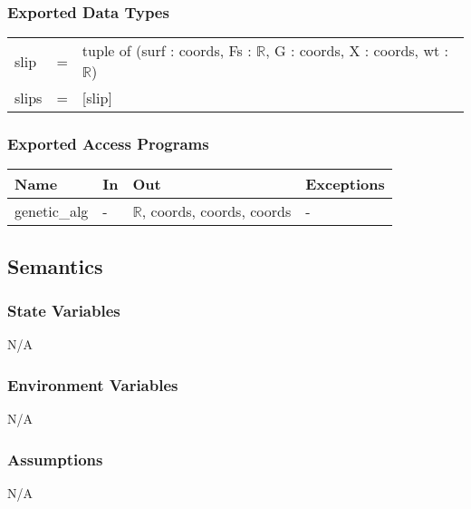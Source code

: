\documentclass[12pt, titlepage]{article}
\begin{document}
\subsubsection{Exported Data Types}
\renewcommand*{\arraystretch}{1.5}
\begin{longtable}{p{} c p{}}
	slip &=& tuple of (surf : coords, Fs : $\mathbb{R}$, G : coords, X : 
	coords, wt : $\mathbb{R}$) \\
	slips &=& [slip] \\
\end{longtable}

\subsubsection{Exported Access Programs}

\begin{center}
	\renewcommand*{\arraystretch}{1.5}
	\begin{tabular} {p{}  p{}  p{} 
			p{} } \hline 
		\textbf{Name} & \textbf{In} & \textbf{Out} & \textbf{Exceptions} \\ 
		\hline
		
		genetic\_alg & - & $\mathbb{R}$, coords, coords, coords & - \\ \hline
	\end{tabular}
\end{center}

\subsection{Semantics}

\subsubsection{State Variables}
N/A

\subsubsection{Environment Variables}
N/A

\subsubsection{Assumptions}
N/A
\end{document}
